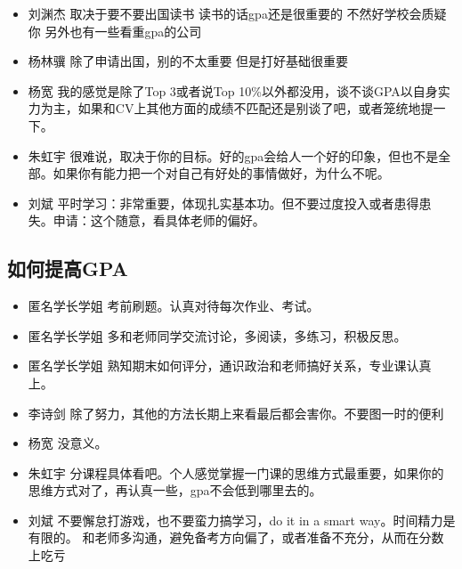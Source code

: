 \documentclass{vivid_layout}
\begin{document}
\begin{itemize}
\item  { 刘渊杰}  \quad 取决于要不要出国读书 读书的话gpa还是很重要的 不然好学校会质疑你 另外也有一些看重gpa的公司
\item  { 杨林骥}  \quad 除了申请出国，别的不太重要 但是打好基础很重要
\item  { 杨宽}  \quad 我的感觉是除了Top 3或者说Top 10\%以外都没用，谈不谈GPA以自身实力为主，如果和CV上其他方面的成绩不匹配还是别谈了吧，或者笼统地提一下。
\item  { 朱虹宇}  \quad 很难说，取决于你的目标。好的gpa会给人一个好的印象，但也不是全部。如果你有能力把一个对自己有好处的事情做好，为什么不呢。 
\item  { 刘斌}  \quad 平时学习：非常重要，体现扎实基本功。但不要过度投入或者患得患失。申请：这个随意，看具体老师的偏好。
\end{itemize}

\subsection{如何提高GPA}

\begin{itemize}
\item {\name 匿名学长学姐}  \quad 考前刷题。认真对待每次作业、考试。
\item  {\name 匿名学长学姐}  \quad 多和老师同学交流讨论，多阅读，多练习，积极反思。
\item  {\name 匿名学长学姐}  \quad 熟知期末如何评分，通识政治和老师搞好关系，专业课认真上。
\item  { 李诗剑}  \quad 除了努力，其他的方法长期上来看最后都会害你。不要图一时的便利
\item  { 杨宽}  \quad 没意义。
\item  { 朱虹宇}  \quad 分课程具体看吧。个人感觉掌握一门课的思维方式最重要，如果你的思维方式对了，再认真一些，gpa不会低到哪里去的。
\item  { 刘斌}  \quad 不要懈怠打游戏，也不要蛮力搞学习，do it in a smart way。时间精力是有限的。
    和老师多沟通，避免备考方向偏了，或者准备不充分，从而在分数上吃亏
\end{itemize}
\end{document}
